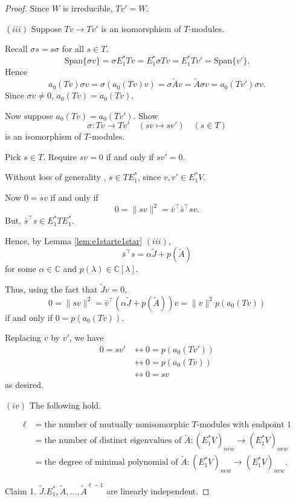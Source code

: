\documentclass[
]{book}
\theoremstyle{definition}
\theoremstyle{definition}
\theoremstyle{definition}
\theoremstyle{definition}
\theoremstyle{remark}
\begin{document}
\begin{proof}
Since \(W\) is irreducible, \(Tv' = W\).

\((iii)\) Suppose \(Tv \to Tv'\) is an isomorsphism of \(T\)-modules.

Recall \(\sigma s = s\sigma\) for all \(s\in T\).
\[\mathrm{Span}\{\sigma v\} = \sigma E^*_1Tv = E^*_1\sigma Tv = E^*_1Tv' = \mathrm{Span}\{v'\}.\]
Hence
\[a_0(Tv)\sigma v = \sigma(a_0(Tv)v) = \sigma \tilde{A}v = \tilde{A}\sigma v = a_0(Tv')\sigma v.\]
Since \(\sigma v \neq 0\), \(a_0(Tv) = a_0(Tv)\).

Now suppose \(a_0(Tv)=a_0(Tv')\). Show
\[\sigma: Tv \to Tv' \quad (sv \mapsto sv') \quad (s\in T)\]
is an isomorphism of \(T\)-modules.

Pick \(s\in T\). Require
\(sv = 0\) if and only if \(sv' = 0\).

Without loss of generality , \(s\in TE^*_1\), since \(v, v'\in E^*_1V\).

Now \(0 = sv\) if and only if
\[0 = \|sv\|^2 = \bar{v}^\top \bar{s}^\top sv.\]
But, \(\bar{s}^\top s\in E^*_1TE^*_1\).

Hence, by Lemma \ref{lem:e1starte1star} \((iii)\),
\[\bar{s}^\top s = \alpha \tilde{J} + p(\tilde{A})\]
for some \(\alpha\in \mathbb{C}\) and \(p(\lambda)\in \mathbb{C}[\lambda]\).

Thus, using the fact that \(\tilde{J}v = 0\),
\[0 = \|sv\|^2 = \bar{v}^\top (\alpha\tilde{J}+p(\tilde{A}))v = \|v\|^2 p(a_0(Tv))\]
if and only if \(0 = p(a_0(Tv))\).

Replacing \(v\) by \(v'\), we have
\begin{align}
0 = sv' & \leftrightarrow 0 = p(a_0(Tv'))\\
& \leftrightarrow 0 = p(a_0(Tv))\\
& \leftrightarrow 0 = sv
\end{align}
as desired.

\((iv)\) The following hold.

\begin{align}
\ell & = \text{the number of mutually nonisomorphic $T$-modules with endpoint $1$}\\
& = \text{the number of distinct eigenvalues of $\tilde{A}:(E^*_1V)_{new}\to (E^*_1V)_{new}$}\\
& = \text{the degree of minimal polynomial of $\tilde{A}:(E^*_1V)_{new}\to (E^*_1V)_{new}$.}
\end{align}

Claim 1. \(\tilde{J}. E^*_1, \tilde{A}, \ldots, \tilde{A}^{\ell-1}\) are linearly independent.


\end{proof}
\end{document}
